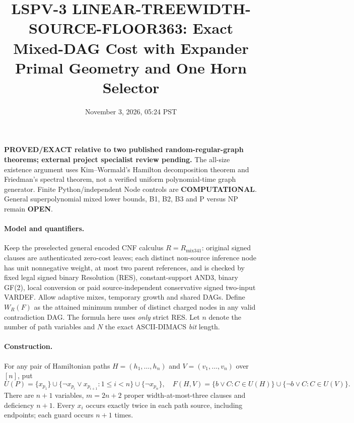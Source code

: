 \documentclass[11pt]{article}
\title{LSPV-3 LINEAR-TREEWIDTH-SOURCE-FLOOR363: Exact Mixed-DAG Cost with Expander Primal Geometry and One Horn Selector}
\date{November 3, 2026, 05:24 PST}
\begin{document}
\maketitle
\noindent\textbf{PROVED/EXACT relative to two published random-regular-graph theorems; external project specialist review pending.} The all-size existence argument uses Kim--Wormald's Hamilton decomposition theorem and Friedman's spectral theorem, not a verified uniform polynomial-time graph generator. Finite Python/independent Node controls are \textbf{COMPUTATIONAL}. General superpolynomial mixed lower bounds, B1, B2, B3 and P versus NP remain \textbf{OPEN}.

\paragraph{Model and quantifiers.}
Keep the preselected general encoded CNF calculus $R=R_{\mathrm{mix341}}$: original signed clauses are authenticated zero-cost leaves; each distinct non-source inference node has unit nonnegative weight, at most two parent references, and is checked by fixed legal signed binary Resolution (RES), constant-support AND3, binary GF(2), local conversion or paid source-independent conservative signed two-input VARDEF. Allow adaptive mixes, temporary growth and shared DAGs. Define $W_R(F)$ as the attained minimum number of distinct charged nodes in any valid contradiction DAG. The formula here uses \emph{only} strict RES. Let $n$ denote the number of path variables and $N$ the exact ASCII-DIMACS \emph{bit} length.

\paragraph{Construction.}
For any pair of Hamiltonian paths $H=(h_1,\ldots,h_n)$ and $V=(v_1,\ldots,v_n)$ over $[n]$, put
\[
U(P)=\{x_{p_1}\}\cup
\{\neg x_{p_i}\lor x_{p_{i+1}}:1\le i<n\}\cup
\{\neg x_{p_n}\},
\quad
F(H,V)=\{b\lor C:C\in U(H)\}\cup\{\neg b\lor C:C\in U(V)\}.
\]
There are $n+1$ variables, $m=2n+2$ proper width-at-most-three clauses and deficiency $n+1$. Every $x_i$ occurs exactly twice in each path source, including endpoints; each guard occurs $n+1$ times.
\end{document}

